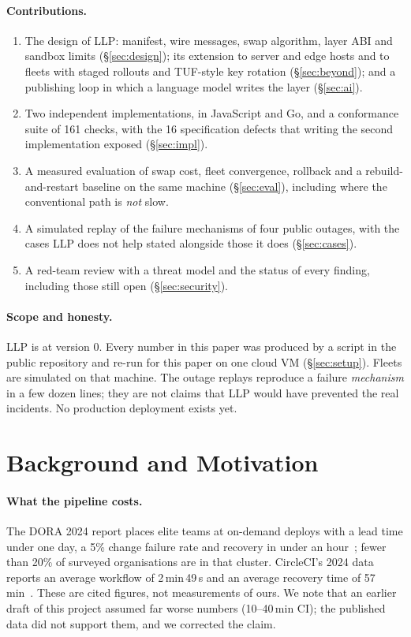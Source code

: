 \documentclass[10pt,twocolumn]{article}
\newcommand{\s}{\,s\xspace}
\begin{document}
\paragraph{Contributions.}
\begin{enumerate}
\item The design of LLP: manifest, wire messages, swap algorithm, layer ABI and sandbox limits
(\S\ref{sec:design}); its extension to server and edge hosts and to fleets with staged rollouts
and TUF-style key rotation (\S\ref{sec:beyond}); and a publishing loop in which a language model
writes the layer (\S\ref{sec:ai}).
\item Two independent implementations, in JavaScript and Go, and a conformance suite of 161
checks, with the 16 specification defects that writing the second implementation exposed
(\S\ref{sec:impl}).
\item A measured evaluation of swap cost, fleet convergence, rollback and a rebuild-and-restart
baseline on the same machine (\S\ref{sec:eval}), including where the conventional path is
\emph{not} slow.
\item A simulated replay of the failure mechanisms of four public outages, with the cases LLP
does not help stated alongside those it does (\S\ref{sec:cases}).
\item A red-team review with a threat model and the status of every finding, including those
still open (\S\ref{sec:security}).
\end{enumerate}

\paragraph{Scope and honesty.} LLP is at version 0. Every number in this paper was produced by a
script in the public repository and re-run for this paper on one cloud VM
(\S\ref{sec:setup}). Fleets are simulated on that machine. The outage replays reproduce a failure
\emph{mechanism} in a few dozen lines; they are not claims that LLP would have prevented the real
incidents. No production deployment exists yet.

\section{Background and Motivation}
\label{sec:background}

\paragraph{What the pipeline costs.} The DORA 2024 report places elite teams at on-demand deploys
with a lead time under one day, a 5\% change failure rate and recovery in under an
hour~\cite{dora2024}; fewer than 20\% of surveyed organisations are in that cluster. CircleCI's
2024 data reports an average workflow of 2\,min\,49\s and an average recovery time of
57\,min~\cite{circleci2024}. These are cited figures, not measurements of ours. We note that an
earlier draft of this project assumed far worse numbers (10--40\,min CI); the published data did
not support them, and we corrected the claim.
\end{document}
